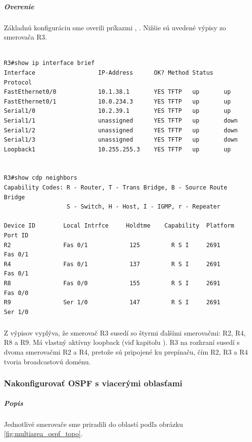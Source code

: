 \documentclass[12pt,twoside,a4paper]{article}
\begin{document}
\subparagraph{Overenie}
\subparagraph{}
Základnú konfiguráciu sme overili príkazmi , . Nižšie sú uvedené výpisy zo smerovača R3.

\noindent
{\selectfont
\begin{small}
\begin{verbatim}

R3#show ip interface brief 
Interface                  IP-Address      OK? Method Status   Protocol
FastEthernet0/0            10.1.38.1       YES TFTP   up       up      
FastEthernet0/1            10.0.234.3      YES TFTP   up       up      
Serial1/0                  10.2.39.1       YES TFTP   up       up      
Serial1/1                  unassigned      YES TFTP   up       down    
Serial1/2                  unassigned      YES TFTP   up       down    
Serial1/3                  unassigned      YES TFTP   up       down    
Loopback1                  10.255.255.3    YES TFTP   up       up      


R3#show cdp neighbors 
Capability Codes: R - Router, T - Trans Bridge, B - Source Route Bridge
                  S - Switch, H - Host, I - IGMP, r - Repeater

Device ID        Local Intrfce     Holdtme    Capability  Platform  Port ID
R2               Fas 0/1            125         R S I     2691      Fas 0/1
R4               Fas 0/1            137         R S I     2691      Fas 0/1
R8               Fas 0/0            155         R S I     2691      Fas 0/0
R9               Ser 1/0            147         R S I     2691      Ser 1/0

\end{verbatim}
\end{small}
}

\subparagraph{}
Z výpisov vyplýva, že smerovač R3 susedí so štyrmi ďalšími smerovačmi: R2, R4, R8 a R9. Má vlastný aktívny loopback (viď kapitolu ). R3 na rozhraní  susedí s dvoma smerovačmi R2 a R4, pretože sú pripojené ku prepínaču, čím R2, R3 a R4 tvoria broadcastovú doménu.

\subsubsection*{Nakonfigurovať OSPF s viacerými oblasťami}
\subparagraph{Popis}
\subparagraph{}
Jednotlivé smerovače sme priradili do oblastí podľa obrázku \ref{fig:multiarea_ospf_topo}.
\end{document}
